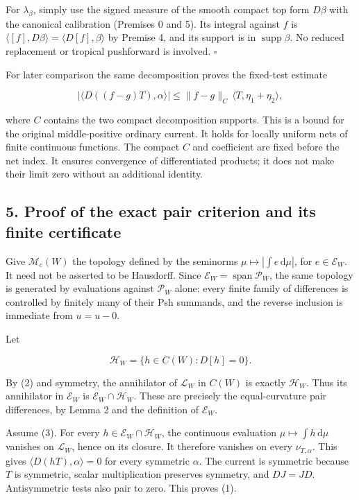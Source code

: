 \documentclass[
  11pt,
]{article}
\begin{document}
For \(\lambda_\beta\), simply use the signed measure of the smooth
compact top form \(D\beta\) with the canonical calibration (Premises 0
and 5). Its integral against \(f\) is
\(\langle[f],D\beta\rangle=\langle D[f],\beta\rangle\) by Premise 4, and
its support is in \(\operatorname{supp}\beta\). No reduced replacement
or tropical pushforward is involved. \(\square\)

For later comparison the same decomposition proves the fixed-test
estimate

\[
\left|\langle D((f-g)T),\alpha\rangle\right|
\leq \|f-g\|_{C}\,\langle T,\eta_1+\eta_2\rangle, \tag{6}
\]

where \(C\) contains the two compact decomposition supports. This is a
bound for the original middle-positive ordinary current. It holds for
locally uniform nets of finite continuous functions. The compact \(C\)
and coefficient are fixed before the net index. It ensures convergence
of differentiated products; it does not make their limit zero without an
additional identity.

\subsection{5. Proof of the exact pair criterion and its finite
certificate}\label{proof-of-the-exact-pair-criterion-and-its-finite-certificate}

Give \(\mathscr M_c(W)\) the topology defined by the seminorms
\(\mu\mapsto|\int e\,\mathrm d\mu|\), for \(e\in\mathcal E_W\). It need
not be asserted to be Hausdorff. Since
\(\mathcal E_W=\operatorname{span}\mathcal P_W\), the same topology is
generated by evaluations against \(\mathcal P_W\) alone: every finite
family of differences is controlled by finitely many of their Psh
summands, and the reverse inclusion is immediate from \(u=u-0\).

Let

\[\mathcal H_W=\{h\in C(W):D[h]=0\}.\]

By (2) and symmetry, the annihilator of \(\mathscr L_W\) in \(C(W)\) is
exactly \(\mathcal H_W\). Thus its annihilator in \(\mathcal E_W\) is
\(\mathcal E_W\cap\mathcal H_W\). These are precisely the
equal-curvature pair differences, by Lemma 2 and the definition of
\(\mathcal E_W\).

Assume (3). For every \(h\in\mathcal E_W\cap\mathcal H_W\), the
continuous evaluation \(\mu\mapsto\int h\,\mathrm d\mu\) vanishes on
\(\mathscr L_W\), hence on its closure. It therefore vanishes on every
\(\nu_{T,\alpha}\). This gives \(\langle D(hT),\alpha\rangle=0\) for
every symmetric \(\alpha\). The current is symmetric because \(T\) is
symmetric, scalar multiplication preserves symmetry, and \(DJ=JD\).
Antisymmetric tests also pair to zero. This proves (1).
\end{document}
